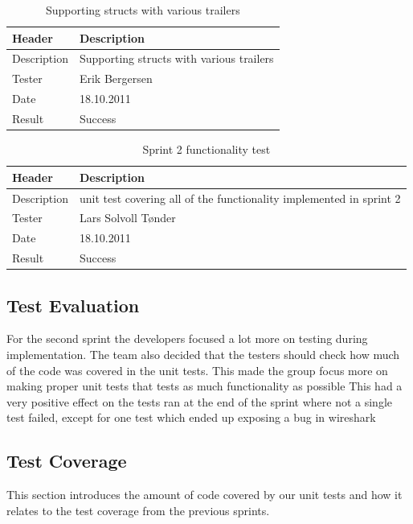 \begin{table}[!htb] \footnotesize \center
\caption{Supporting \glspl{struct} with various \gls{trailers} \label{tab:sp2TID13}}
\begin{tabular}{l l}
	\toprule
	Header & Description \\
	\midrule
	Description & Supporting \glspl{struct} with various \gls{trailers} \\
	Tester & Erik Bergersen \\
	Date & 18.10.2011 \\
	Result & Success\\
	\bottomrule
\end{tabular}
\end{table}

\begin{table}[!htb] \footnotesize \center
\caption{Sprint 2 functionality test\label{tab:sp2TID14}}
\begin{tabular}{l l}
	\toprule
	Header & Description \\
	\midrule
	Description & unit test covering all of the functionality implemented in sprint 2 \\
	Tester & Lars Solvoll Tønder \\
	Date & 18.10.2011 \\
	Result & Success\\
	\bottomrule
\end{tabular}
\end{table}

\subsection{Test Evaluation}
For the second sprint the developers focused a lot more on testing during implementation. The team also decided that the testers should check how much of the code was covered in the unit tests. This made the group focus more on making proper unit tests that tests as much functionality as possible This had a very positive effect on the tests ran at the end of the sprint where not a single test failed, except for one test which ended up exposing a bug in \Gls{wireshark}

\subsection{Test Coverage}
This section introduces the amount of code covered by our unit tests and how it relates to the test coverage from the previous sprints.

